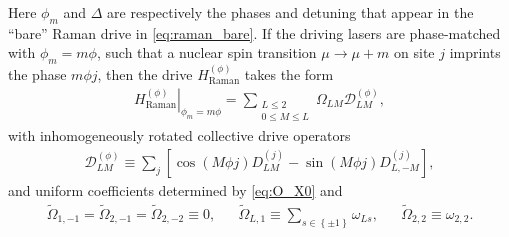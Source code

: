 \documentclass[nofootinbib,notitlepage,11pt]{revtex4-2}
\renewcommand{\t}{\text} %
\newcommand{\p}[1]{\left(#1\right)} %
\renewcommand{\sp}[1]{\left[#1\right]} %
\renewcommand{\set}[1]{\left\{#1\right\}} %
\newcommand{\1}{\mathds{1}}
\newcommand{\D}{\mathcal{D}}
\begin{document}
Here $\phi_m$ and $\Delta$ are respectively the phases and detuning
that appear in the ``bare'' Raman drive in \eqref{eq:raman_bare}.  If
the driving lasers are phase-matched with $\phi_m=m\phi$, such that a
nuclear spin transition $\mu\to\mu+m$ on site $j$ imprints the phase
$m\phi j$, then the drive $H_{\t{Raman}}^{(\phi)}$ takes the form
\begin{align}
  \left. H_{\t{Raman}}^{(\phi)} \right|_{\phi_m=m\phi}
  = \sum_{\substack{L\le2\\0\le M\le L}} \Omega_{LM} \D_{LM}^{(\phi)},
\end{align}
with inhomogeneously rotated collective drive operators
\begin{align}
  \D_{LM}^{(\phi)}
  \equiv \sum_j \sp{\cos\p{M\phi j} D_{LM}^{(j)}
    - \sin\p{M\phi j} D_{L,-M}^{(j)}},
\end{align}
and uniform coefficients determined by \eqref{eq:O_X0} and
\begin{align}
  \tilde\Omega_{1,-1} = \tilde\Omega_{2,-1}
  = \tilde\Omega_{2,-2} \equiv 0,
  &&
  \tilde\Omega_{L,1} \equiv \sum_{s\in\set{\pm1}} \omega_{Ls},
  &&
  \tilde\Omega_{2,2} \equiv \omega_{2,2}.
\end{align}


\end{document}
